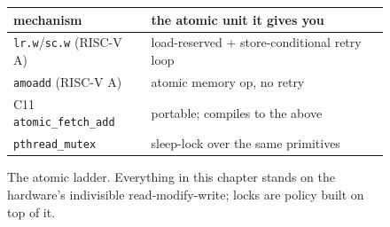 \begin{figure}[htbp]
\centering
\begin{tabular}{ll}
\toprule
mechanism & the atomic unit it gives you \\
\midrule
\texttt{lr.w}/\texttt{sc.w} (RISC-V A) & load-reserved + store-conditional retry loop \\
\texttt{amoadd} (RISC-V A) & atomic memory op, no retry \\
C11 \texttt{atomic\_fetch\_add} & portable; compiles to the above \\
\texttt{pthread\_mutex} & sleep-lock over the same primitives \\
\bottomrule
\end{tabular}
\caption{The atomic ladder. Everything in this chapter stands on
the hardware's indivisible read-modify-write; locks are policy built
on top of it.}
\label{fig:atomic13}
\end{figure}
